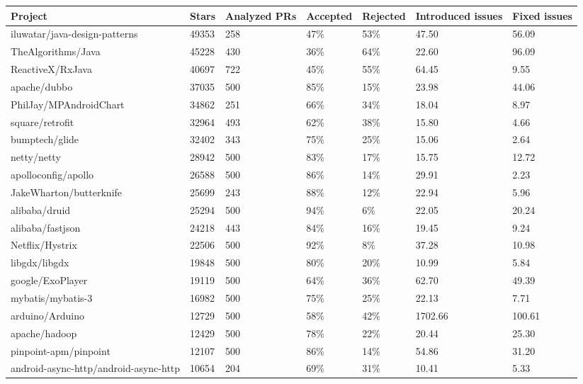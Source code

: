\begin{tabular}{|p{3.5cm}p{1.5cm}p{1.5cm}p{1.5cm}p{1.5cm}p{1.5cm}p{1cm}|}
  \hline
Project & Stars & Analyzed PRs & Accepted & Rejected & Introduced issues & Fixed issues \\ 
  \hline \hline
iluwatar/java-design-patterns & 49353 & 258 & 47\% & 53\% & 47.50 & 56.09 \\ 
  TheAlgorithms/Java & 45228 & 430 & 36\% & 64\% & 22.60 & 96.09 \\ 
  ReactiveX/RxJava & 40697 & 722 & 45\% & 55\% & 64.45 & 9.55 \\ 
  apache/dubbo & 37035 & 500 & 85\% & 15\% & 23.98 & 44.06 \\ 
  PhilJay/MPAndroidChart & 34862 & 251 & 66\% & 34\% & 18.04 & 8.97 \\ 
  square/retrofit & 32964 & 493 & 62\% & 38\% & 15.80 & 4.66 \\ 
  bumptech/glide & 32402 & 343 & 75\% & 25\% & 15.06 & 2.64 \\ 
  netty/netty & 28942 & 500 & 83\% & 17\% & 15.75 & 12.72 \\ 
  apolloconfig/apollo & 26588 & 500 & 86\% & 14\% & 29.91 & 2.23 \\ 
  JakeWharton/butterknife & 25699 & 243 & 88\% & 12\% & 22.94 & 5.96 \\ 
  alibaba/druid & 25294 & 500 & 94\% & 6\% & 22.05 & 20.24 \\ 
  alibaba/fastjson & 24218 & 443 & 84\% & 16\% & 19.45 & 9.24 \\ 
  Netflix/Hystrix & 22506 & 500 & 92\% & 8\% & 37.28 & 10.98 \\ 
  libgdx/libgdx & 19848 & 500 & 80\% & 20\% & 10.99 & 5.84 \\ 
  google/ExoPlayer & 19119 & 500 & 64\% & 36\% & 62.70 & 49.39 \\ 
  mybatis/mybatis-3 & 16982 & 500 & 75\% & 25\% & 22.13 & 7.71 \\ 
  arduino/Arduino & 12729 & 500 & 58\% & 42\% & 1702.66 & 100.61 \\ 
  apache/hadoop & 12429 & 500 & 78\% & 22\% & 20.44 & 25.30 \\ 
  pinpoint-apm/pinpoint & 12107 & 500 & 86\% & 14\% & 54.86 & 31.20 \\ 
  android-async-http/android-async-http & 10654 & 204 & 69\% & 31\% & 10.41 & 5.33 \\ 
   \hline
\end{tabular}
